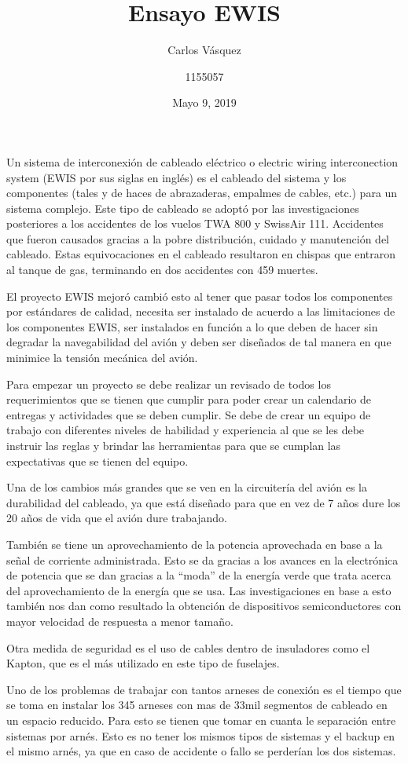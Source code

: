 \documentclass[12pt, letterpaper]{article}
\title{Ensayo EWIS}
\author{Carlos Vásquez \and 1155057}
\date{Mayo 9, 2019}
\begin{document}
\maketitle
Un sistema de interconexión de cableado eléctrico o electric wiring interconection system (EWIS por sus siglas en inglés) es el cableado del sistema y los componentes (tales y de haces de abrazaderas, empalmes de cables, etc.) para un sistema complejo. Este tipo de cableado se adoptó por las investigaciones posteriores a los accidentes de los vuelos TWA 800 y SwissAir 111. Accidentes que fueron causados gracias a la pobre distribución, cuidado y manutención del cableado. Estas equivocaciones en el cableado resultaron en chispas que entraron al tanque de gas, terminando en dos accidentes con 459 muertes.

El proyecto EWIS mejoró cambió esto al tener que pasar todos los componentes por estándares de calidad, necesita ser instalado de acuerdo a las limitaciones de los componentes EWIS, ser instalados en función a lo que deben de hacer sin degradar la navegabilidad del avión y deben ser diseñados de tal manera en que minimice la tensión mecánica del avión. 

Para empezar un proyecto se debe realizar un revisado de todos los requerimientos que se tienen que cumplir para poder crear un calendario de entregas y actividades que se deben cumplir. Se debe de crear un equipo de trabajo con diferentes niveles de habilidad y experiencia al que se les debe instruir las reglas y brindar las herramientas para que se cumplan las expectativas que se tienen del equipo.

Una de los cambios más grandes que se ven en la circuitería del avión es la durabilidad del cableado, ya que está diseñado para que en vez de 7 años dure los 20 años de vida que el avión dure trabajando. 

También se tiene un aprovechamiento de la potencia aprovechada en base a la señal de corriente administrada. Esto se da gracias a los avances en la electrónica de potencia que se dan gracias a la “moda” de la energía verde que trata acerca del aprovechamiento de la energía que se usa. Las investigaciones en base a esto también nos dan como resultado la obtención de dispositivos semiconductores con mayor velocidad de respuesta a menor tamaño.  

Otra medida de seguridad es el uso de cables dentro de insuladores como el Kapton, que es el más utilizado en este tipo de fuselajes. 

Uno de los problemas de trabajar con tantos arneses de conexión es el tiempo que se toma en instalar los 345 arneses con mas de 33mil segmentos de cableado en un espacio reducido. Para esto se tienen que tomar en cuanta le separación entre sistemas por arnés. Esto es no tener los mismos tipos de sistemas y el backup en el mismo arnés, ya que en caso de accidente o fallo se perderían los dos sistemas.
\end{document}
